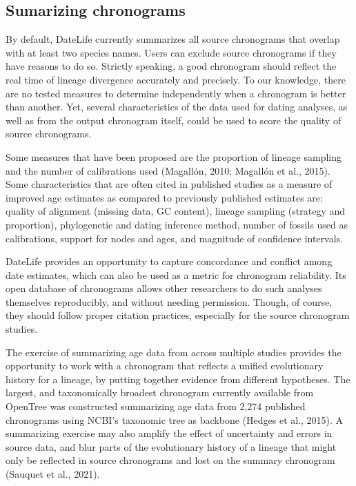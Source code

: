 \documentclass[english,man]{apa6}
\begin{document}
\hypertarget{sumarizing-chronograms}{%
\subsection{Sumarizing chronograms}\label{sumarizing-chronograms}}

By default, DateLife currently summarizes all source chronograms that overlap with at least two species names. Users can exclude source chronograms if they have reasons to do so.
Strictly speaking, a good chronogram should reflect the real time of lineage divergence accurately and precisely.
To our knowledge, there are no tested measures to determine independently when a chronogram is better than another. Yet, several characteristics of the data used for dating analyses, as well as from the output chronogram itself, could be used to score the quality of source chronograms.

Some measures that have been proposed are the proportion of lineage sampling and the number of calibrations used (Magallón, 2010; Magallón et al., 2015).
Some characteristics that are often cited in published studies as a measure of improved age estimates as compared to previously published estimates are: quality of alignment (missing data, GC content), lineage sampling (strategy and proportion), phylogenetic and dating inference method, number of fossils used as calibrations, support for nodes and ages, and magnitude of confidence intervals.

DateLife provides an opportunity to capture concordance and conflict among date estimates, which can also be used as a metric for chronogram reliability.
Its open database of chronograms allows other researchers to do such analyses themselves reproducibly, and without needing permission. Though, of course, they should follow proper citation practices, especially for the source chronogram studies.

The exercise of summarizing age data from across multiple studies provides the opportunity to work with a chronogram that reflects a unified evolutionary history for a lineage, by putting together evidence from different hypotheses.
The largest, and taxonomically broadest chronogram currently available from OpenTree was constructed summarizing age data from 2,274 published chronograms using NCBI's taxonomic tree as backbone (Hedges et al., 2015).
A summarizing exercise may also amplify the effect of uncertainty and errors in source data, and blur parts of the evolutionary history of a lineage that might only be reflected in source chronograms and lost on the summary chronogram (Sauquet et al., 2021).
\end{document}
